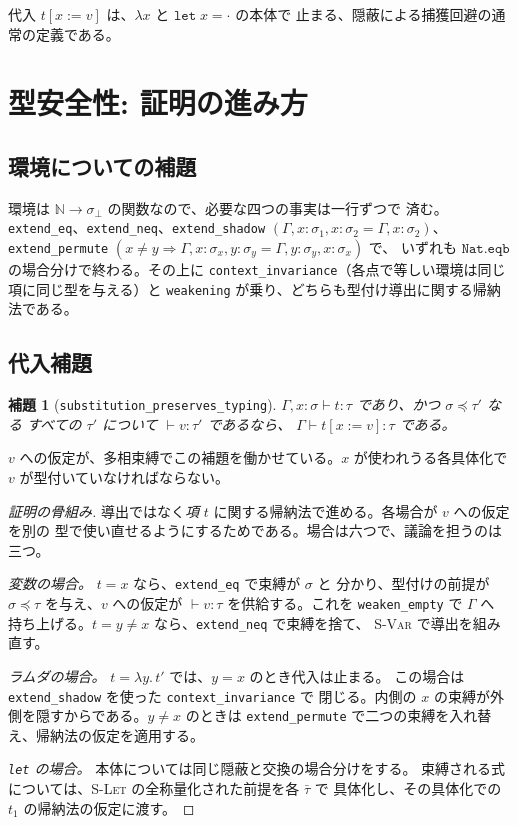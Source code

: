\documentclass[11pt,a4paper]{ltjsarticle}
\newtheorem{lemma}[theorem]{補題}
\newcommand{\inst}{\preceq}
\newcommand{\subst}[3]{#1[#2 := #3]}
\begin{document}
代入 $\subst{t}{x}{v}$ は、$\lambda x$ と $\mathtt{let}\;x = \cdot$ の本体で
止まる、隠蔽による捕獲回避の通常の定義である。

\section{型安全性: 証明の進み方}
\label{sec:safe-proof}

\subsection{環境についての補題}

環境は $\mathbb{N} \to \sigma_\bot$ の関数なので、必要な四つの事実は一行ずつで
済む。\texttt{extend\_eq}、\texttt{extend\_neq}、\texttt{extend\_shadow}
$(\Gamma, x{:}\sigma_1, x{:}\sigma_2 = \Gamma, x{:}\sigma_2)$、
\texttt{extend\_permute} $(x \neq y \Rightarrow
\Gamma, x{:}\sigma_x, y{:}\sigma_y = \Gamma, y{:}\sigma_y, x{:}\sigma_x)$ で、
いずれも $\mathtt{Nat.eqb}$ の場合分けで終わる。その上に
\texttt{context\_invariance}（各点で等しい環境は同じ項に同じ型を与える）と
\texttt{weakening} が乗り、どちらも型付け導出に関する帰納法である。

\subsection{代入補題}

\begin{lemma}[\texttt{substitution\_preserves\_typing}]
  $\Gamma, x{:}\sigma \vdash t : \tau$ であり、かつ $\sigma \inst \tau'$ なる
  \emph{すべての} $\tau'$ について $\vdash v : \tau'$ であるなら、
  $\Gamma \vdash \subst{t}{x}{v} : \tau$ である。
\end{lemma}

$v$ への仮定が、多相束縛でこの補題を働かせている。$x$ が使われうる各具体化で
$v$ が型付いていなければならない。

\begin{proof}[証明の骨組み]
導出ではなく\emph{項} $t$ に関する帰納法で進める。各場合が $v$ への仮定を別の
型で使い直せるようにするためである。場合は六つで、議論を担うのは三つ。

\emph{変数の場合。} $t = x$ なら、\texttt{extend\_eq} で束縛が $\sigma$ と
分かり、型付けの前提が $\sigma \inst \tau$ を与え、$v$ への仮定が
$\vdash v : \tau$ を供給する。これを \texttt{weaken\_empty} で $\Gamma$ へ
持ち上げる。$t = y \neq x$ なら、\texttt{extend\_neq} で束縛を捨て、
\textsc{S-Var} で導出を組み直す。

\emph{ラムダの場合。} $t = \lambda y.\,t'$ では、$y = x$ のとき代入は止まる。
この場合は \texttt{extend\_shadow} を使った \texttt{context\_invariance} で
閉じる。内側の $x$ の束縛が外側を隠すからである。$y \neq x$ のときは
\texttt{extend\_permute} で二つの束縛を入れ替え、帰納法の仮定を適用する。

\emph{\texttt{let} の場合。} 本体については同じ隠蔽と交換の場合分けをする。
束縛される式については、\textsc{S-Let} の全称量化された前提を各 $\bar\tau$ で
具体化し、その具体化での $t_1$ の帰納法の仮定に渡す。
\end{proof}
\end{document}
